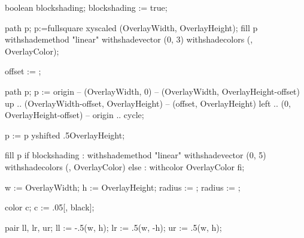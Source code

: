 


\startmodule [slide-mp]

\unprotect


	boolean blockshading; blockshading := true;
\stopMPdefinitions

	path p; p:=fullsquare xyscaled (OverlayWidth, OverlayHeight);
	fill p
		withshademethod "linear"
		withshadevector (0, 3)
		withshadecolors (, OverlayColor);
\stopuseMPgraphic

	offset := ;

	path p; p :=
		origin                                    -- (OverlayWidth, 0)                    --
		(OverlayWidth, OverlayHeight-offset) {up} .. (OverlayWidth-offset, OverlayHeight) --
		(offset, OverlayHeight) {left}            .. (0, OverlayHeight-offset)            --
		origin                                    .. cycle;

	p := p yshifted .5OverlayHeight;

	fill p
		if blockshading :
			withshademethod "linear"
			withshadevector (0, 5)
			withshadecolors (, OverlayColor)
		else :
			withcolor OverlayColor
		fi;
\stopuseMPgraphic

	w      := OverlayWidth;
	h      := OverlayHeight;
	radius := ;
	radius := ;

	color c;
	c := .05[, black];

	pair ll, lr, ur;
	ll := -.5(w,  h);
	lr :=  .5(w, -h);
	ur :=  .5(w,  h);

